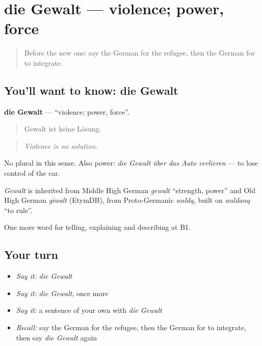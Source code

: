 \section[die Gewalt]{die Gewalt — violence; power, force}

\label{lesson:GE-C361-gewalt}



\begin{quote}
Before the new one: say the German for the refugee, then the German for to integrate.
\end{quote}

\subsection*{You'll want to know: die Gewalt}
\textbf{die Gewalt} — \textquotedblleft{}violence; power, force\textquotedblright{}.

\begin{quote}
Gewalt ist keine Lösung.
\end{quote}

\begin{quote}
\emph{Violence is no solution.}
\end{quote}

No plural in this sense. Also power: \emph{die Gewalt über das Auto verlieren} — to lose control of the car.

\begin{cousinweb}
\emph{Gewalt} is inherited from Middle High German \emph{gewalt} \textquotedblleft{}strength, power\textquotedblright{} and Old High German \emph{giwalt} (EtymDB), from Proto-Germanic \emph{waldą}, built on \emph{waldaną} \textquotedblleft{}to rule\textquotedblright{}.
\end{cousinweb}

\begin{grammarlens}[title={What you've built}]
One more word for telling, explaining and describing at B1.
\end{grammarlens}

\subsection*{Your turn}
\begin{itemize}
\raggedright
  \item \emph{Say it:} \emph{die Gewalt}
  \item \emph{Say it:} \emph{die Gewalt}, once more
  \item \emph{Say it:} a sentence of your own with \emph{die Gewalt}
  \item \emph{Recall:} say the German for the refugee, then the German for to integrate, then say \emph{die Gewalt} again
\end{itemize}

